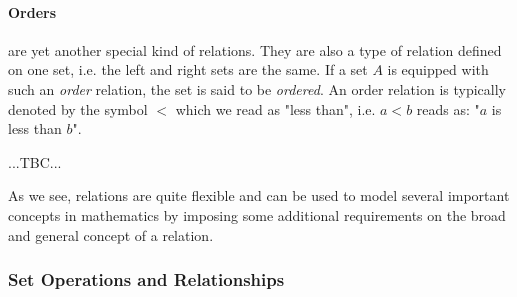 


\paragraph{Orders} are yet another special kind of relations. They are also a type of relation defined on one set, i.e. the left and right sets are the same. If a set $A$ is equipped with such an \emph{order} relation, the set is said to be \emph{ordered}. An order relation is typically denoted by the symbol $<$ which we read as "less than", i.e. $a < b$ reads as: "$a$ is less than $b$".

...TBC...



\medskip
As we see, relations are quite flexible and can be used to model several important concepts in mathematics by imposing some additional requirements on the broad and general concept of a relation.

\subsubsection{Set Operations and Relationships}

